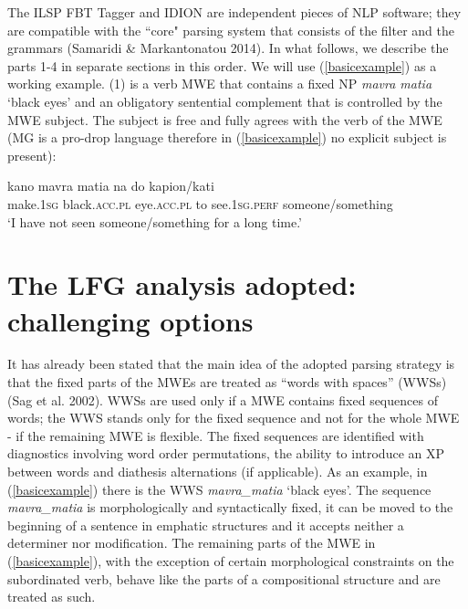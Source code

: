\documentclass[output=paper,
modfonts
]{langscibook}
\begin{document}
The ILSP FBT Tagger and IDION are independent pieces of NLP software; they are compatible with the ``core" parsing system that consists of the filter and the grammars (Samaridi \& Markantonatou 2014).  In what follows, we describe the parts 1-4 in separate sections in this order. 
We will use (\ref{basicexample}) as a working example. (1) is a verb MWE that contains a fixed NP \textit{mavra matia} `black eyes' and an obligatory sentential complement that is controlled by the MWE subject. The subject is free and fully agrees with the verb of the MWE (MG is a pro-drop language therefore in (\ref{basicexample}) no explicit subject is present): 

\ea
\label{basicexample}
\gll kano                  mavra            matia              na do            kapion/kati\\
make.\textsc{1sg} black.\textsc{acc}.\textsc{pl} eye.\textsc{acc}.\textsc{pl} to see.\textsc{1sg}.\textsc{perf} someone/something\\
\glt `I have not seen someone/something for a long time.’
\z


\section{The LFG analysis adopted: challenging options}
It has already been stated that the main idea of the adopted parsing strategy is that the fixed parts of the MWEs are treated as “words with spaces” (WWSs) (Sag et al. 2002).  WWSs are used only if a MWE contains fixed sequences of words; the WWS stands only for the fixed sequence and not for the whole MWE - if the remaining MWE is flexible. The fixed sequences are identified with diagnostics involving word order permutations, the ability to introduce an XP between words and diathesis alternations (if applicable). As an example, in (\ref{basicexample}) there is the WWS \textit{mavra\_matia} `black eyes'. The sequence \textit{mavra\_matia} is morphologically and syntactically fixed, it can be moved to the beginning of a sentence in emphatic structures and it accepts neither a determiner nor modification. The remaining parts of the MWE in (\ref{basicexample}), with the exception of certain morphological constraints on the subordinated verb, behave like the parts of a compositional structure and are treated as such. 
\end{document}
